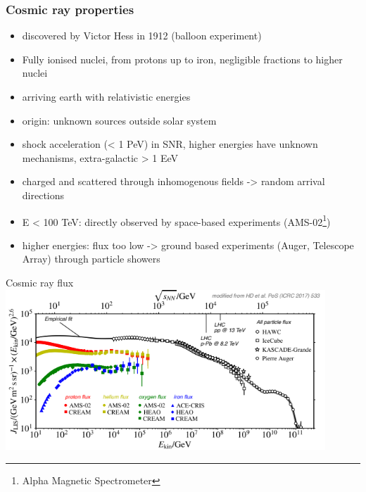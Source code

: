 \documentclass[aspectratio=1610, 9pt]{beamer}
\begin{document}
\begin{frame}\frametitle{Cosmic ray properties}
  \begin{itemize}
    \item discovered by Victor Hess in 1912 (balloon experiment)
    \item Fully ionised nuclei, from protons up to iron, negligible fractions
    to higher nuclei
    \item arriving earth with relativistic energies
    \item origin: unknown sources outside solar system
    \item shock acceleration (< 1 PeV) in SNR, higher energies have unknown
    mechanisms, extra-galactic > 1 EeV
    \item charged and scattered through inhomogenous fields -> random arrival directions
    \item E < 100 TeV: directly observed by space-based experiments (AMS-02\footnote{Alpha Magnetic Spectrometer})
    \item higher energies: flux too low -> ground based experiments
    (Auger, Telescope Array) through particle showers
  \end{itemize}
\end{frame}

\begin{frame}{Cosmic ray flux}
  \includegraphics[width=0.9\textwidth]{knee_heel.png}
\end{frame}

\end{document}
